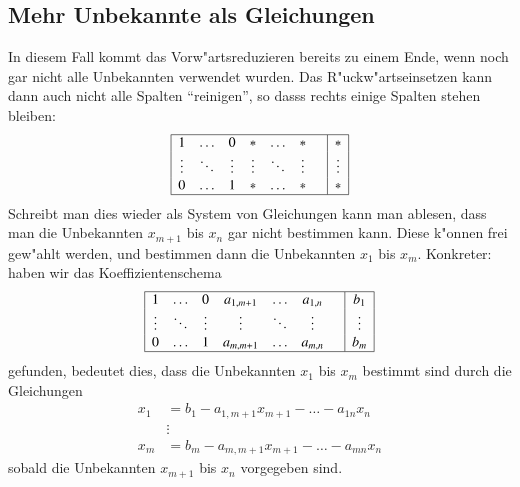 \subsection{Mehr Unbekannte als Gleichungen}
In diesem Fall kommt das Vorw"artsreduzieren bereits zu einem Ende,
wenn noch gar nicht alle Unbekannten verwendet wurden.
Das R"uckw"artseinsetzen kann dann auch nicht alle Spalten ``reinigen'',
so dasss rechts einige Spalten stehen bleiben:
\begin{gather}
\begin{array}{|ccccccc|c|}
\hline
1&\dots&0&*&\dots&*&&*\\
\vdots&\ddots&\vdots&\vdots&\ddots&\vdots&&\vdots\\
0&\dots&1&*&\dots&*&&*\\
\hline
\end{array}
\end{gather}
Schreibt man dies wieder als System von Gleichungen kann man ablesen,
dass man die Unbekannten $x_{m+1}$ bis $x_n$ gar nicht bestimmen kann.
Diese k"onnen frei gew"ahlt werden, und bestimmen dann die Unbekannten
$x_1$ bis $x_m$. Konkreter: haben wir das Koeffizientenschema
\begin{gather}
\begin{array}{|ccccccc|c|}
\hline
1&\dots&0&a_{1,m+1}&\dots&a_{1,n}&&b_1\\
\vdots&\ddots&\vdots&\vdots&\ddots&\vdots&&\vdots\\
0&\dots&1&a_{m,m+1}&\dots&a_{m,n}&&b_m\\
\hline
\end{array}
\end{gather}
gefunden, bedeutet dies, dass die Unbekannten $x_1$ bis $x_m$ bestimmt
sind durch die Gleichungen
\begin{align*}
x_1&=b_1-a_{1,m+1}x_{m+1}-\dots-a_{1n}x_n\\
&\vdots\\
x_m&=b_m-a_{m,m+1}x_{m+1}-\dots-a_{mn}x_n
\end{align*}
sobald die Unbekannten $x_{m+1}$ bis $x_n$ vorgegeben sind.
